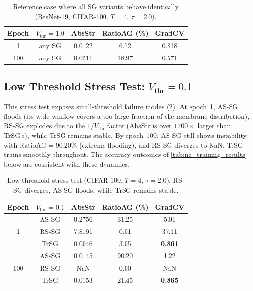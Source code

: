 \begin{table}[h]
\centering
\small
\begin{tabular}{ccccc}
\toprule
\textbf{Epoch} & $V_{\text{thr}}{=}1.0$ & \textbf{AbsStr} & \textbf{RatioAG (\%)} & \textbf{GradCV} \\
\midrule
1   & any SG & 0.0122 & 6.72  & 0.818 \\
100 & any SG & 0.0211 & 18.97 & 0.571 \\
\bottomrule
\end{tabular}
\caption{Reference case where all SG variants behave identically (ResNet-19, CIFAR-100, $T=4$, $\tau=2.0$).}
\label{tab:metrics_ref}
\end{table}

\subsection{Low Threshold Stress Test: $V_{\text{thr}}=0.1$}
\label{subsec:exp_trsg_metric_low}

This stress test exposes small-threshold failure modes (\cref{tab:metrics_low}). At epoch~1, AS-SG floods (its wide window covers a too-large fraction of the membrane distribution), RS-SG explodes due to the $1/V_{\text{thr}}$ factor (AbsStr is over $1700\times$ larger than TrSG's), while TrSG remains stable. By epoch~100, AS-SG still shows instability with $\mathrm{RatioAG}=90.20\%$ (extreme flooding), and RS-SG diverges to NaN. TrSG trains smoothly throughout. The accuracy outcomes of \cref{tab:no_training_results} below are consistent with these dynamics.

\begin{table}[h]
\centering
\small
\begin{tabular}{ccccc}
\toprule
\textbf{Epoch} & $V_{\text{thr}}{=}0.1$ & \textbf{AbsStr} & \textbf{RatioAG (\%)} & \textbf{GradCV} \\
\midrule
\multirow{3}{*}{1} & AS-SG & 0.2756 & 31.25 & 5.01  \\
                   & RS-SG & 7.8191 & 0.01  & 37.11 \\
                   & TrSG  & 0.0046 & 3.05  & \textbf{0.861} \\
\midrule
\multirow{3}{*}{100} & AS-SG & 0.0145 & 90.20 & 1.22  \\
                     & RS-SG & NaN    & 0.00  & NaN   \\
                     & TrSG  & 0.0153 & 21.45 & \textbf{0.865} \\
\bottomrule
\end{tabular}
\caption{Low-threshold stress test (CIFAR-100, $T=4$, $\tau=2.0$). RS-SG diverges, AS-SG floods, while TrSG remains stable.}
\label{tab:metrics_low}
\end{table}

